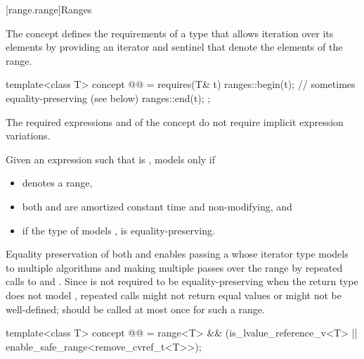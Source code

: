 [range.range]{Ranges}

\pnum
The  concept defines the requirements of a type that allows
iteration over its elements by providing an iterator and sentinel
that denote the elements of the range.

\begin{itemdecl}
template<class T>
  concept @@ =
    requires(T& t) {
      ranges::begin(t);                         // sometimes equality-preserving (see below)
      ranges::end(t);
    };
\end{itemdecl}

\begin{itemdescr}
\pnum
The required expressions
and
of the  concept
do not require implicit expression variations.

\pnum
Given an expression  such that  is ,
 models  only if
\begin{itemize}
\item {}
  denotes a range,

\item both
and
are amortized constant time and non-modifying, and

\item if the type of  models
,  is equality-preserving.
\end{itemize}

\pnum
\begin{note}
Equality preservation of both  and
 enables passing a  whose iterator
type models  to multiple
algorithms and making multiple passes over the range by repeated calls to
 and .
Since  is not required to be equality-preserving
when the return type does not model , repeated calls
might not return equal values or might not be well-defined;
 should be called at most once for such a range.
\end{note}
\end{itemdescr}

\begin{itemdecl}
template<class T>
  concept @@ =
    range<T> &&
      (is_lvalue_reference_v<T> || enable_safe_range<remove_cvref_t<T>>);
\end{itemdecl}

